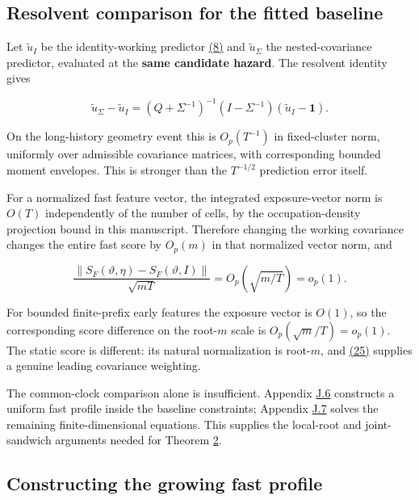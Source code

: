 \documentclass[11pt]{article}
\begin{document}
\subsection{Resolvent comparison for the fitted baseline}\label{sec:J.5}

Let \(\widetilde u_I\) be the identity-working predictor \hyperref[eq:8]{(8)} and \(\widetilde u_\Sigma\) the nested-covariance predictor, evaluated at the \textbf{same candidate hazard}. The resolvent identity gives

\begin{equation*}
\widetilde u_\Sigma-\widetilde u_I
 =(Q+\Sigma^{-1})^{-1}(I-\Sigma^{-1})(\widetilde u_I-\mathbf1).
\tag{J.18}\label{eq:J.18}
\end{equation*}

On the long-history geometry event this is \(O_p(T^{-1})\) in fixed-cluster norm, uniformly over admissible covariance matrices, with corresponding bounded moment envelopes. This is stronger than the \(T^{-1/2}\) prediction error itself.

For a normalized fast feature vector, the integrated exposure-vector norm is \(O(T)\) independently of the number of cells, by the occupation-density projection bound in this manuscript. Therefore changing the working covariance changes the entire fast score by \(O_p(m)\) in that normalized vector norm, and

\begin{equation*}
\frac{\|S_F(\vartheta,\eta)-S_F(\vartheta,I)\|}{\sqrt{mT}}
 =O_p\!\left(\sqrt{m/T}\right)=o_p(1).
\tag{J.19}\label{eq:J.19}
\end{equation*}

For bounded finite-prefix early features the exposure vector is \(O(1)\), so the corresponding score difference on the root-\(m\) scale is \(O_p(\sqrt m/T)=o_p(1)\). The static score is different: its natural normalization is root-\(m\), and \hyperref[eq:25]{(25)} supplies a genuine leading covariance weighting.

The common-clock comparison alone is insufficient. Appendix \hyperref[sec:J.6]{J.6} constructs a uniform fast profile inside the baseline constraints; Appendix \hyperref[sec:J.7]{J.7} solves the remaining finite-dimensional equations. This supplies the local-root and joint-sandwich arguments needed for Theorem \hyperref[res:Theorem-2]{2}.

\subsection{Constructing the growing fast profile}\label{sec:J.6}
\end{document}

